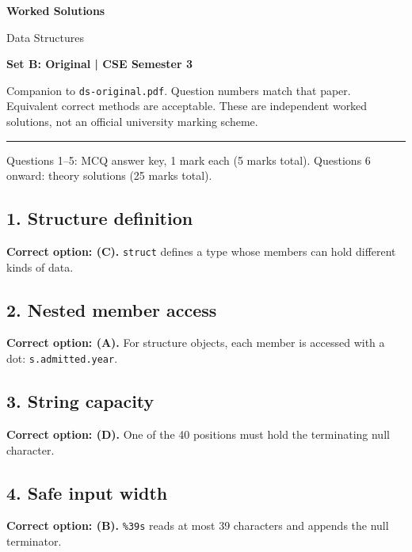 \documentclass[11pt,a4paper]{article}
\begin{document}
{\LARGE\bfseries Worked Solutions}\par{\large Data Structures}\par\textbf{Set B: Original | CSE Semester 3}\par
Companion to \texttt{ds-original.pdf}. Question numbers match that paper. Equivalent correct methods are acceptable. These are independent worked solutions, not an official university marking scheme.\par\medskip\hrule\medskip
Questions 1--5: MCQ answer key, 1 mark each (5 marks total). Questions 6 onward: theory solutions (25 marks total).\par
\noindent\begin{minipage}{\linewidth}\subsection*{1. Structure definition}
\textbf{Correct option: (C).} \texttt{struct} defines a type whose members can hold different kinds of data.
\end{minipage}\par\medskip
\noindent\begin{minipage}{\linewidth}\subsection*{2. Nested member access}
\textbf{Correct option: (A).} For structure objects, each member is accessed with a dot: \texttt{s.admitted.year}.
\end{minipage}\par\medskip
\noindent\begin{minipage}{\linewidth}\subsection*{3. String capacity}
\textbf{Correct option: (D).} One of the 40 positions must hold the terminating null character.
\end{minipage}\par\medskip
\noindent\begin{minipage}{\linewidth}\subsection*{4. Safe input width}
\textbf{Correct option: (B).} \texttt{\%39s} reads at most 39 characters and appends the null terminator.
\end{minipage}\par\medskip
\end{document}
